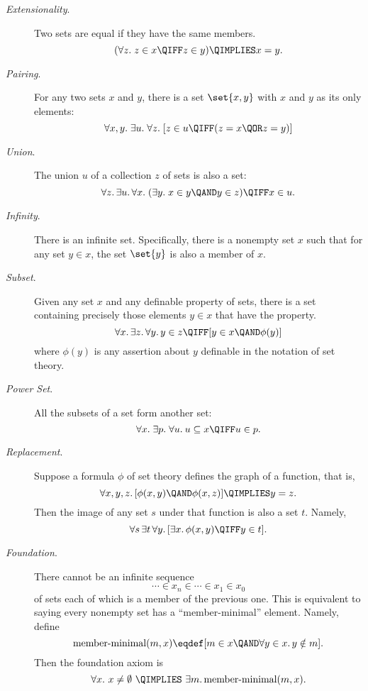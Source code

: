 \begin{description}

\item[\emph{Extensionality}.]
  Two sets are equal if they have the same members.
\[
(\forall z.\; z \in x \QIFF z \in y) \QIMPLIES x = y.
\]

\item[\emph{Pairing}.] For
  any two sets $x$ and $y$, there is a set $\set{x,y}$ with $x$ and
  $y$ as its only elements:
\[
\forall x,y.\; \exists u.\; \forall z.\;
[z \in u \QIFF (z = x \QOR z = y)]
\]

\item[\emph{Union}.]  The union
  $u$ of a collection $z$ of sets is also a set:
\[
\forall z.\, \exists u.\, \forall x.\; (\exists y.\; x \in y \QAND y
\in z) \QIFF x \in u.
\]

\item[\emph{Infinity}.]  There
  is an infinite set.  Specifically, there is a nonempty set $x$
  such that for any set $y \in x$, the set $\set{y}$ is also a member
  of $x$.

\item[\emph{Subset}.] Given any
  set $x$ and any definable property of sets, there is a set
  containing precisely those elements $y \in x$ that have the
  property.
\[
\forall x.\, \exists z.\, \forall y.\, y \in z \QIFF [y \in x \QAND \phi(y)]
\]
where $\phi(y)$ is any assertion about $y$ definable in the notation
of set theory.

\item[\emph{Power Set}.]  All the
  subsets of a set form another set:
\[
\forall x.\; \exists p.\; \forall u.\: u \subseteq x \QIFF u \in p.
\]

\item[\emph{Replacement}.]
  Suppose a formula $\phi$ of set theory defines the graph of a
  function, that is,
\[
\forall x, y, z.\, [\phi(x,y) \QAND \phi(x,z)] \QIMPLIES y = z.
\]
Then the image of any set $s$ under that function is also a set $t$.  Namely,
\[
\forall s\, \exists t\, \forall y.\, [\exists x.\, \phi(x,y) \QIFF y \in t].
\]

\item[\emph{Foundation}.] 
There cannot be an infinite sequence
\[
\cdots \in x_n \in \cdots \in x_1 \in x_0
\]
of sets each of which is a member of the previous one.  This is equivalent
to saying every nonempty set has a ``member-minimal'' element.  Namely, define
\[
\text{member-minimal}(m, x) \eqdef [m \in x \QAND \forall y \in x.\, y \notin m].
\]
Then the foundation axiom is
\[
\forall x.\ x \neq \emptyset\ \QIMPLIES\ \exists m.\, \text{member-minimal}(m, x).
\]


\end{description}
